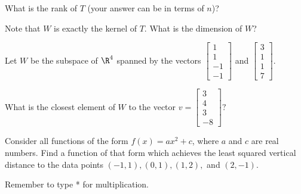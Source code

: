 
What is the rank of $T$ (your answer can be in terms of $n$)?  


Note that $W$ is exactly the kernel of $T$.  What is the dimension of $W$?    


\edXsolution{ 

}
 
\endedxproblem





Let $W$ be the subspace of $\R^4$ spanned by the vectors 
$\left[\begin{array}{c} 
1 \\ 1 \\ -1 \\ -1 \end{array} \right]$ 
and 
$\left[\begin{array}{c} 
3 \\ 1 \\ 1 \\ 7 \end{array} \right].$

What is the closest element of $W$ to the vector 
$v =  \left[\begin{array}{c} 
3 \\ 4 \\ 3 \\ -8 \end{array} \right]?$






\edXsolution{ 

	
}


\endedxproblem





Consider all functions of the form $f(x) = ax^2 + c$, where $a$ and $c$ are real numbers.  
Find a function of that form which achieves
the least squared vertical distance to the data points $(-1, 1), (0,1), (1, 2),$ and $(2, -1)$. 

Remember to type * for multiplication.




\edXsolution{ 

}

\endedxproblem


\endedxvertical







